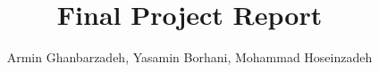 %
%


\documentclass[
	12pt, %
]{packages/fphw}




\title{Final Project Report} %

\author{Armin Ghanbarzadeh, Yasamin Borhani, Mohammad Hoseinzadeh} %

